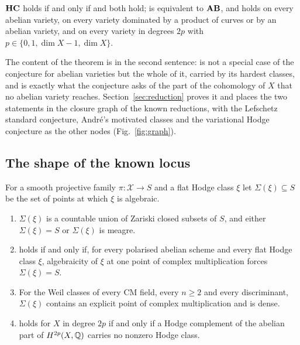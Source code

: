 \begin{theorem}[Reduction]\label{thm:intro-reduction}
$\mathbf{HC}$ holds if and only if \Fii{} and \Fiii{} both hold; \Fii{} is equivalent to $\mathbf{AB}$, and \Fiii{} holds on every abelian variety, on every variety dominated by a product of curves or by an abelian variety, and on every variety in degrees $2p$ with $p\in\{0,1,\dim X-1,\dim X\}$.
\end{theorem}

The content of the theorem is in the second sentence: \Fii{} is not a special case of the conjecture for abelian varieties but the whole of it, carried by its hardest classes, and \Fiii{} is exactly what the conjecture asks of the part of the cohomology of $X$ that no abelian variety reaches. Section~\ref{sec:reduction} proves it and places the two statements in the closure graph of the known reductions, with the Lefschetz standard conjecture, Andr\'e's motivated classes and the variational Hodge conjecture as the other nodes (Fig.~\ref{fig:graph}).

\subsection{The shape of the known locus}

For a smooth projective family $\pi\colon\mathcal{X}\to S$ and a flat Hodge class $\xi$ let $\Sigma(\xi)\subseteq S$ be the set of points at which $\xi$ is algebraic.

\begin{theorem}\label{thm:intro-loci}
\leavevmode
\begin{enumerate}[label=\textup{(\roman*)},leftmargin=2.4em,itemsep=2pt]
\item $\Sigma(\xi)$ is a countable union of Zariski closed subsets of $S$, and either $\Sigma(\xi)=S$ or $\Sigma(\xi)$ is meagre.
\item \Fii{} holds if and only if, for every polarised abelian scheme and every flat Hodge class $\xi$, algebraicity of $\xi$ at one point of complex multiplication forces $\Sigma(\xi)=S$.
\item For the Weil classes of every CM field, every $n\ge2$ and every discriminant, $\Sigma(\xi)$ contains an explicit point of complex multiplication and is dense.
\item \Fiii{} holds for $X$ in degree $2p$ if and only if a Hodge complement of the abelian part of $H^{2p}(X,\mathbb{Q})$ carries no nonzero Hodge class.
\end{enumerate}
\end{theorem}

